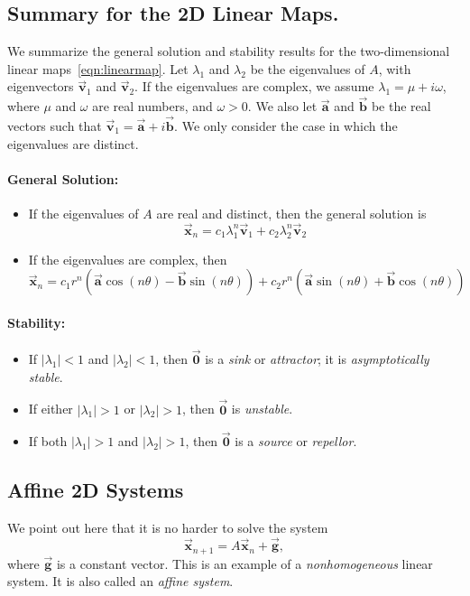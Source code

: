 \documentclass{book}
\newcommand{\BA}{\vec{\textbf{a}}}
\newcommand{\BB}{\vec{\textbf{b}}}
\newcommand{\BG}{\vec{\textbf{g}}}
\newcommand{\BV}{\vec{\textbf{v}}}
\newcommand{\BX}{\vec{\textbf{x}}}
\newcommand{\BZ}{\vec{\textbf{0}}}  %
\begin{document}
\subsection*{Summary for the 2D Linear Maps.}
We summarize the general solution and stability results
for the two-dimensional linear maps~\eqref{eqn:linearmap}.
Let $\lambda_1$ and $\lambda_2$ be the eigenvalues of
$A$, with eigenvectors $\BV_1$ and $\BV_2$.
If the eigenvalues are complex, we assume
$\lambda_1 = \mu+i\omega$, where $\mu$ and $\omega$
are real numbers, and $\omega > 0$.  We also let $\BA$ and $\BB$
be the real vectors such that $\BV_1 = \BA+i\BB$.
We only consider the case in which the eigenvalues are distinct. 

\paragraph{General Solution:}
\begin{itemize}
\item If the eigenvalues of $A$ are real and distinct, then the
general solution is
\begin{equation}
   \BX_n = c_1 \lambda_1^n \BV_1 + c_2 \lambda_2^n \BV_2
\end{equation}
\item If the eigenvalues are complex, then
\begin{equation}
  \BX_n =    c_1 r^n(\BA\cos(n\theta)-\BB\sin(n\theta))
           + c_2 r^n(\BA\sin(n\theta)+\BB\cos(n\theta))
\end{equation}
\end{itemize}
\paragraph{Stability:}
\begin{itemize}
\item If $|\lambda_1| < 1$ and $|\lambda_2| < 1$, then
$\BZ$ is a \emph{sink} or \emph{attractor}; it is
\emph{asymptotically stable}.
\item If either $|\lambda_1| > 1$ or $|\lambda_2|>1$, then
$\BZ$ is \emph{unstable}.
\item If both $|\lambda_1| > 1$ and $|\lambda_2|>1$, then
$\BZ$ is a \emph{source} or \emph{repellor}.
\end{itemize}

\subsection{Affine 2D Systems}
We point out here that it is no harder to solve the
system
\begin{equation}
  \BX_{n+1} = A\BX_n + \BG,
  \label{eqn:affine}
\end{equation}
where $\BG$ is a constant vector.
This is an example of a \emph{nonhomogeneous}
linear system.  It is also called an \emph{affine system}.
\end{document}

